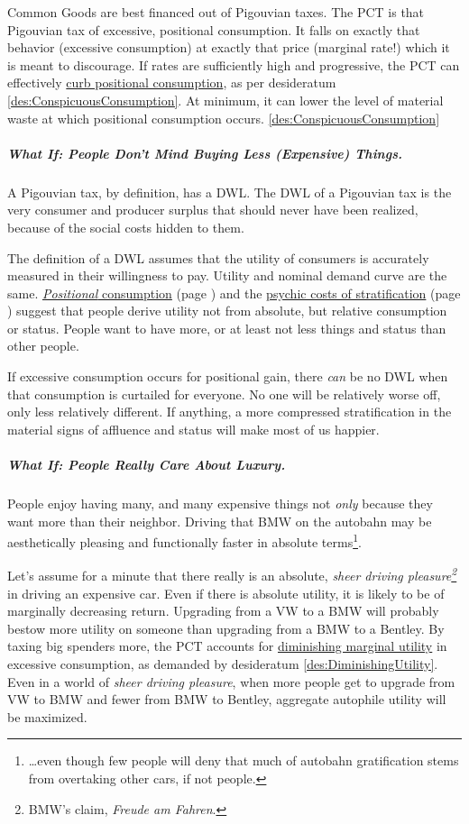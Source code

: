 Common Goods are best financed out of Pigouvian taxes. The PCT is that Pigouvian tax of excessive, positional consumption. It falls on exactly that behavior (excessive consumption) at exactly that price (marginal rate!) which it is meant to discourage. If rates are sufficiently high and progressive, the PCT can effectively \hyperref[des:ConspicuousConsumption]{curb positional consumption}, as per desideratum \ref{des:ConspicuousConsumption}. At minimum, it can lower the level of material waste at which positional consumption occurs. \ref{des:ConspicuousConsumption}

\subparagraph{What If: People Don't Mind Buying Less (Expensive) Things.} A Pigouvian tax, by definition, has a DWL. The DWL of a Pigouvian tax is the very consumer and producer surplus that should never have been realized, because of the social costs hidden to them.

The definition of a DWL assumes that the utility of consumers is accurately measured in their willingness to pay. Utility and nominal demand curve are the same. \hyperref[sec:ConspicuousConsumption]{\emph{Positional} consumption} (page \pageref{sec:ConspicuousConsumption}) and the \hyperref[sec:PsychicCosts]{psychic costs of stratification} (page \pageref{sec:PsychicCosts}) suggest that people derive utility not from absolute, but relative consumption or status. People want to have more, or at least not less things and status than other people.

If excessive consumption occurs for positional gain, there \emph{can} be no DWL when that consumption is curtailed for everyone. No one will be relatively worse off, only less relatively different. If anything, a more compressed stratification in the material signs of affluence and status will make most of us happier.

\subparagraph{What If: People Really Care About Luxury.} People enjoy having many, and many expensive things not \emph{only} because they want more than their neighbor. Driving that BMW on the autobahn may be aesthetically pleasing and functionally faster in absolute terms\footnote{
	\ldots even though few people will deny that much of autobahn gratification stems from overtaking other cars, if not people.}.

Let's assume for a minute that there really is an absolute, \emph{sheer driving pleasure\footnote{
	BMW's claim, \emph{Freude am Fahren}.}}
in driving an expensive car. Even if there is absolute utility, it is likely to be of marginally decreasing return. Upgrading from a VW to a BMW will probably bestow more utility on someone than upgrading from a BMW to a Bentley. By taxing big spenders more, the PCT accounts for \hyperref[des:DiminishingUtility]{diminishing marginal utility} in excessive consumption, as demanded by desideratum \ref{des:DiminishingUtility}. Even in a world of \emph{sheer driving pleasure}, when more people get to upgrade from VW to BMW and fewer from BMW to Bentley, aggregate autophile utility will be maximized.

